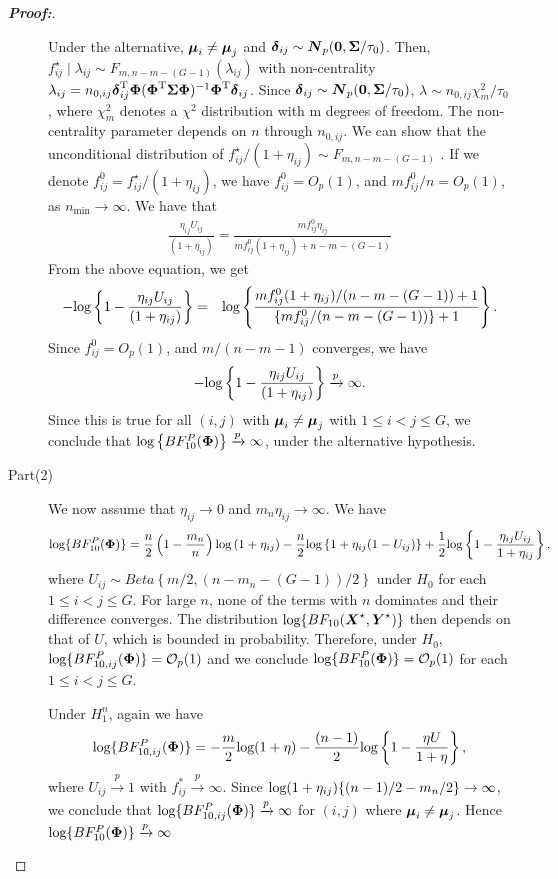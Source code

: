 \documentclass[12pt]{article}
\theoremstyle{plain}%
\theoremstyle{definition}
\def\log{\hbox{log}}
\def\log{\hbox{log}}
\def\bse{\begin{eqnarray*}}
\def\ese{\end{eqnarray*}}
\def\be{\begin{eqnarray}}
\def\ee{\end{eqnarray}}
\def\trans{^{\rm T}}
\newcommand{\uN}       {\mbox{\boldmath$N$}}
\newcommand{\uX}       {\mbox{\boldmath$X$}}
\newcommand{\uY}       {\mbox{\boldmath$Y$}}
\newcommand{\udelta}            {\mbox{\boldmath$\delta$}}
\newcommand{\umu}               {\mbox{\boldmath$\mu$}}
\newcommand{\uSigma}            {\mbox{\boldmath$\Sigma$}}
\newcommand{\uPhi}              {\mbox{\boldmath$\Phi$}}
\begin{document}
\begin{proof}[\textbf{\upshape Proof:}]
\begin{description}
Under the alternative, $\umu_{i} \neq \umu_{j}$ and $\udelta_{ij} \sim \uN_{p}({\bf 0}, \uSigma /\tau_{0})$.
Then, $f_{ij}^{\star} \mid   \lambda_{ij} \sim F_{m, n-m-(G-1)}(\lambda_{ij})$
with non-centrality $\lambda_{ij} = n_{0,ij}\udelta_{ij}\trans\uPhi(\uPhi\trans \uSigma \uPhi)^{-1}\uPhi\trans \udelta_{ij}$.
Since $\udelta_{ij} \sim \uN_{p}({\bf 0}, \uSigma /\tau_{0})$, $\lambda \sim n_{0,ij}\chi_{m}^{2}/\tau_{0}$,
where $\chi_{m}^{2}$ denotes a $\chi^{2}$ distribution with m degrees of freedom. The non-centrality parameter depends on $n$ through $n_{0,ij}$.
We can show that the unconditional distribution of $f_{ij}^{\star} /(1 + \eta_{ij}) \sim F_{m, n-m-(G-1)}$ \citep[see][page 704]{johnson2005bayes}.
If we denote $f_{ij}^{0} =  f_{ij}^{\star} /(1 + \eta_{ij})$, we have $f_{ij}^{0} = O_{p}(1)$, and $mf_{ij}^{0}/n = O_{p}(1)$, as $n_{\min} \rightarrow \infty$.
We have that
\be
\frac{\eta_{ij} U_{ij}}{(1+\eta_{ij})} = \frac{ m f_{ij}^{0}\eta_{ij}}{m f_{ij}^{0}(1+\eta_{ij})+n-m-(G-1)} \nonumber
\ee
From the above equation, we get
\be
-\log\left\{ 1 - \frac{\eta_{ij} U_{ij}}{(1+\eta_{ij})} \right \} &=& \log\left\{ \frac{mf_{ij}^{0}(1+\eta_{ij})/(n-m-(G-1)) + 1}{\{mf_{ij}^{0}/(n-m-(G-1))\} +1 }\right\}. \nonumber
\ee
Since $f_{ij}^{0} = O_{p}(1)$, and $m/(n-m-1)$ converges, we have
\bse
 -\log\left\{ 1 - \frac{\eta_{ij} U_{ij}}{(1+\eta_{ij})} \right \} \xrightarrow[]{p} \infty.
\ese
Since this is true for all $(i,j)$ with $\umu_i \neq \umu_j$ with $1 \leq i < j \leq G$,  we conclude that $\log\left\{BF^{P}_{10}(\uPhi) \right \} \xrightarrow[]{p} \infty$, under the alternative hypothesis.

\item[Part(2)]
We now assume that $\eta_{ij} \rightarrow 0$ and $m_n \eta_{ij} \rightarrow \infty$. We have
\be
 \log\{BF^{P}_{10}(\uPhi)\} =\frac{n}{2}\left( 1 - \frac{m_n}{n}\right)\log\left(1 + \eta_{ij} \right) - \frac{n}{2}\log\left\{ 1 + \eta_{ij}(1-U_{ij}) \right \} +\frac{1}{2}\log \left\{1 - \frac{\eta_{ij} U_{ij}}{1+\eta_{ij}}\right\},  \nonumber
\ee
where $U_{ij} \sim Beta\left\{ m/2,  (n - m_n -(G-1))/2 \right\}$ under $H_0$ for each $1 \leq i < j \leq G$.
For large $n$, none of the terms with $n$ dominates and their difference converges.
The distribution $ \log\{BF_{10}(\uX^{\star},\uY^{\star}) \}$ then depends on that of $U$, which is bounded in probability.
Therefore, under $H_0$, $\log\{BF^{P}_{10, ij}(\uPhi) \} = \mathcal{O}_{p}(1)$ and we conclude $\log\{BF^{P}_{10}(\uPhi) \} = \mathcal{O}_{p}(1)$ for each $1 \leq i < j \leq G$.

Under $H^{n}_{1}$, again we have
\be
\log\{BF^{P}_{10,ij}(\uPhi) \} = -\frac{m}{2}\log(1 + \eta) - \frac{(n-1)}{2}\log\left\{ 1 - \frac{\eta U}{1 + \eta} \right\}, \nonumber
\ee
where $U_{ij} \xrightarrow[]{p} 1$ with $f_{ij}^{*}\xrightarrow[]{p} \infty$.
Since $\log(1 + \eta_{ij})\{ (n-1)/2 - m_n/2\} \rightarrow \infty$, we conclude that $\log\{BF^{P}_{10,ij}(\uPhi) \} \xrightarrow[]{p} \infty $ for $(i,j)$ where $\umu_i \neq \umu_j$. Hence $\log\{BF^{P}_{10}(\uPhi) \} \xrightarrow[]{p} \infty $
\end{description}
\end{proof}
\end{document}
